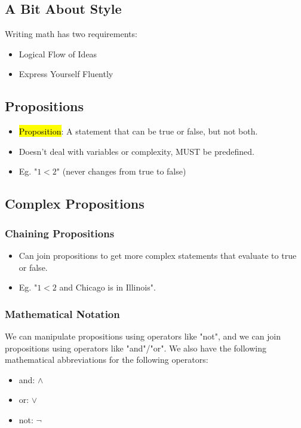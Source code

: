 \subsection{A Bit About Style}
Writing math has two requirements:
\begin{itemize}
    \item Logical Flow of Ideas
    \item Express Yourself Fluently
\end{itemize}

\subsection{Propositions}
\begin{itemize}
    \item \hl{Proposition}: A statement that can be true or false, but not both.
    \item Doesn't deal with variables or complexity, MUST be predefined.
    \item Eg. "$1 < 2$" (never changes from true to false)
\end{itemize}

\subsection{Complex Propositions}
\subsubsection{Chaining Propositions}
\begin{itemize}
    \item Can join propositions to get more complex statements that evaluate to true or false.
    \item Eg. "$1<2$ and Chicago is in Illinois".
\end{itemize}

\subsubsection{Mathematical Notation}
We can manipulate propositions using operators like "not", and we can join propositions using operators like "and"/"or".
We also have the following mathematical abbreviations for the following operators:
\begin{itemize}
    \item and: $\land$
    \item or: $\lor$
    \item not: $\neg$
\end{itemize}

